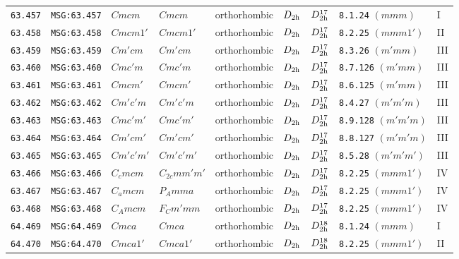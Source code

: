 \documentclass[fleqn,10pt]{jsarticle}
\begin{document}
\begin{center}
\begin{longtable}{lllllllll}
\texttt{63.457} & \texttt{MSG:63.457} & $Cmcm$ & $Cmcm$ & orthorhombic & $D_{\rm 2h}$ & $D_{\rm 2h}^{17}$ & \texttt{8.1.24} $(mmm)$ & I \\
\texttt{63.458} & \texttt{MSG:63.458} & $Cmcm1'$ & $Cmcm1'$ & orthorhombic & $D_{\rm 2h}$ & $D_{\rm 2h}^{17}$ & \texttt{8.2.25} $(mmm1')$ & II \\
\texttt{63.459} & \texttt{MSG:63.459} & $Cm'cm$ & $Cm'cm$ & orthorhombic & $D_{\rm 2h}$ & $D_{\rm 2h}^{17}$ & \texttt{8.3.26} $(m'mm)$ & III \\
\texttt{63.460} & \texttt{MSG:63.460} & $Cmc'm$ & $Cmc'm$ & orthorhombic & $D_{\rm 2h}$ & $D_{\rm 2h}^{17}$ & \texttt{8.7.126} $(m'mm)$ & III \\
\texttt{63.461} & \texttt{MSG:63.461} & $Cmcm'$ & $Cmcm'$ & orthorhombic & $D_{\rm 2h}$ & $D_{\rm 2h}^{17}$ & \texttt{8.6.125} $(m'mm)$ & III \\
\texttt{63.462} & \texttt{MSG:63.462} & $Cm'c'm$ & $Cm'c'm$ & orthorhombic & $D_{\rm 2h}$ & $D_{\rm 2h}^{17}$ & \texttt{8.4.27} $(m'm'm)$ & III \\
\texttt{63.463} & \texttt{MSG:63.463} & $Cmc'm'$ & $Cmc'm'$ & orthorhombic & $D_{\rm 2h}$ & $D_{\rm 2h}^{17}$ & \texttt{8.9.128} $(m'm'm)$ & III \\
\texttt{63.464} & \texttt{MSG:63.464} & $Cm'cm'$ & $Cm'cm'$ & orthorhombic & $D_{\rm 2h}$ & $D_{\rm 2h}^{17}$ & \texttt{8.8.127} $(m'm'm)$ & III \\
\texttt{63.465} & \texttt{MSG:63.465} & $Cm'c'm'$ & $Cm'c'm'$ & orthorhombic & $D_{\rm 2h}$ & $D_{\rm 2h}^{17}$ & \texttt{8.5.28} $(m'm'm')$ & III \\
\texttt{63.466} & \texttt{MSG:63.466} & $C_{c}mcm$ & $C_{2c}mm'm'$ & orthorhombic & $D_{\rm 2h}$ & $D_{\rm 2h}^{17}$ & \texttt{8.2.25} $(mmm1')$ & IV \\
\texttt{63.467} & \texttt{MSG:63.467} & $C_{a}mcm$ & $P_{A}mma$ & orthorhombic & $D_{\rm 2h}$ & $D_{\rm 2h}^{17}$ & \texttt{8.2.25} $(mmm1')$ & IV \\
\texttt{63.468} & \texttt{MSG:63.468} & $C_{A}mcm$ & $F_{C}m'mm$ & orthorhombic & $D_{\rm 2h}$ & $D_{\rm 2h}^{17}$ & \texttt{8.2.25} $(mmm1')$ & IV \\ \hline
\texttt{64.469} & \texttt{MSG:64.469} & $Cmca$ & $Cmca$ & orthorhombic & $D_{\rm 2h}$ & $D_{\rm 2h}^{18}$ & \texttt{8.1.24} $(mmm)$ & I \\
\texttt{64.470} & \texttt{MSG:64.470} & $Cmca1'$ & $Cmca1'$ & orthorhombic & $D_{\rm 2h}$ & $D_{\rm 2h}^{18}$ & \texttt{8.2.25} $(mmm1')$ & II \\

\end{longtable}
\end{center}
\end{document}
